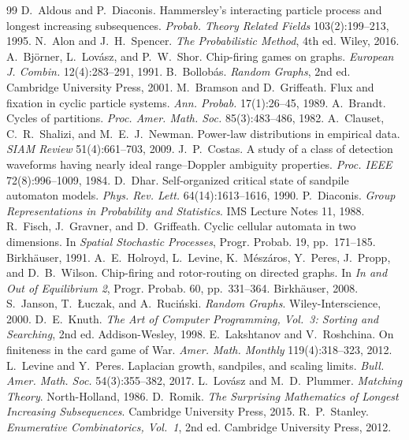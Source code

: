 \documentclass[11pt]{article}
\theoremstyle{definition}
\theoremstyle{remark}
\begin{document}
\begin{thebibliography}{99}
 D.~Aldous and P.~Diaconis. Hammersley's interacting particle process and longest increasing
subsequences. \emph{Probab. Theory Related Fields} 103(2):199--213, 1995.
 N.~Alon and J.~H.~Spencer. \emph{The Probabilistic Method}, 4th ed. Wiley, 2016.
 A.~Bj\"orner, L.~Lov\'asz, and P.~W.~Shor. Chip-firing games on graphs. \emph{European J. Combin.}
12(4):283--291, 1991.
 B.~Bollob\'as. \emph{Random Graphs}, 2nd ed. Cambridge University Press, 2001.
 M.~Bramson and D.~Griffeath. Flux and fixation in cyclic particle systems. \emph{Ann. Probab.}
17(1):26--45, 1989.
 A.~Brandt. Cycles of partitions. \emph{Proc. Amer. Math. Soc.} 85(3):483--486, 1982.
 A.~Clauset, C.~R.~Shalizi, and M.~E.~J.~Newman. Power-law distributions in empirical data.
\emph{SIAM Review} 51(4):661--703, 2009.
 J.~P.~Costas. A study of a class of detection waveforms having nearly ideal range--Doppler ambiguity
properties. \emph{Proc. IEEE} 72(8):996--1009, 1984.
 D.~Dhar. Self-organized critical state of sandpile automaton models. \emph{Phys. Rev. Lett.}
64(14):1613--1616, 1990.
 P.~Diaconis. \emph{Group Representations in Probability and Statistics}. IMS Lecture Notes 11, 1988.
 R.~Fisch, J.~Gravner, and D.~Griffeath. Cyclic cellular automata in two dimensions. In \emph{Spatial
Stochastic Processes}, Progr. Probab. 19, pp.~171--185. Birkh\"auser, 1991.
 A.~E.~Holroyd, L.~Levine, K.~M\'esz\'aros, Y.~Peres, J.~Propp, and D.~B.~Wilson. Chip-firing and
rotor-routing on directed graphs. In \emph{In and Out of Equilibrium 2}, Progr. Probab. 60, pp.~331--364. Birkh\"auser,
2008.
 S.~Janson, T.~\L uczak, and A.~Ruci\'nski. \emph{Random Graphs}. Wiley-Interscience, 2000.
 D.~E.~Knuth. \emph{The Art of Computer Programming, Vol.~3: Sorting and Searching}, 2nd ed.
Addison-Wesley, 1998.
 E.~Lakshtanov and V.~Roshchina. On finiteness in the card game of War. \emph{Amer. Math. Monthly}
119(4):318--323, 2012.
 L.~Levine and Y.~Peres. Laplacian growth, sandpiles, and scaling limits. \emph{Bull. Amer. Math.
Soc.} 54(3):355--382, 2017.
 L.~Lov\'asz and M.~D.~Plummer. \emph{Matching Theory}. North-Holland, 1986.
 D.~Romik. \emph{The Surprising Mathematics of Longest Increasing Subsequences}. Cambridge University
Press, 2015.
 R.~P.~Stanley. \emph{Enumerative Combinatorics, Vol.~1}, 2nd ed. Cambridge University Press, 2012.
\end{thebibliography}
\end{document}
